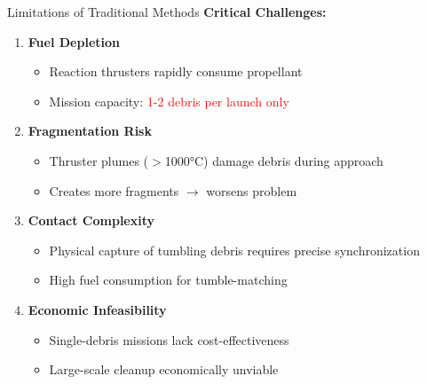 \documentclass[aspectratio=169]{beamer}
\begin{document}
\begin{frame}{Limitations of Traditional Methods}
\textbf{Critical Challenges:}

\begin{enumerate}
    \item \textbf{Fuel Depletion}
    \begin{itemize}
        \item Reaction thrusters rapidly consume propellant
        \item Mission capacity: \textcolor{red}{1-2 debris per launch only}
    \end{itemize}

    \item \textbf{Fragmentation Risk}
    \begin{itemize}
        \item Thruster plumes ($>$1000°C) damage debris during approach
        \item Creates more fragments $\rightarrow$ worsens problem
    \end{itemize}

    \item \textbf{Contact Complexity}
    \begin{itemize}
        \item Physical capture of tumbling debris requires precise synchronization
        \item High fuel consumption for tumble-matching
    \end{itemize}

    \item \textbf{Economic Infeasibility}
    \begin{itemize}
        \item Single-debris missions lack cost-effectiveness
        \item Large-scale cleanup economically unviable
    \end{itemize}
\end{enumerate}
\end{frame}
\end{document}
